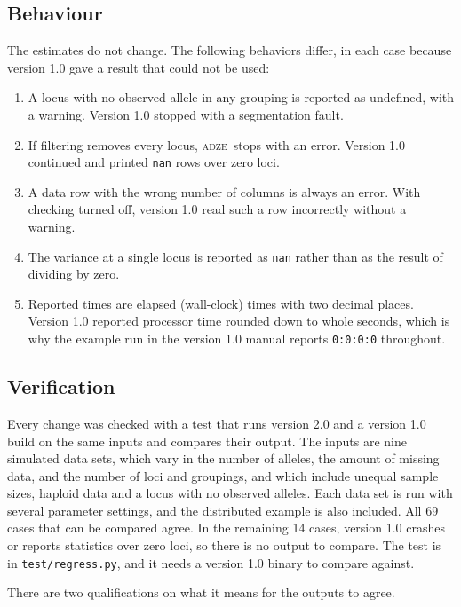 \documentclass[11pt]{article}
\newcommand{\prog}{\textsc{adze}}
\begin{document}
\subsection{Behaviour}

The estimates do not change. The following behaviors differ, in each case
because version 1.0 gave a result that could not be used:

\begin{enumerate}[leftmargin=1.5em]
\item A locus with no observed allele in any grouping is reported as
  undefined, with a warning. Version 1.0 stopped with a segmentation fault.
\item If filtering removes every locus, \prog\ stops with an error. Version 1.0
  continued and printed \texttt{nan} rows over zero loci.
\item A data row with the wrong number of columns is always an error. With
  checking turned off, version 1.0 read such a row incorrectly without a
  warning.
\item The variance at a single locus is reported as \texttt{nan} rather than as
  the result of dividing by zero.
\item Reported times are elapsed (wall-clock) times with two decimal places.
  Version 1.0 reported processor time rounded down to whole seconds, which is
  why the example run in the version 1.0 manual reports \texttt{0:0:0:0}
  throughout.
\end{enumerate}

\subsection{Verification}

Every change was checked with a test that runs version 2.0 and a version 1.0
build on the same inputs and compares their output. The inputs are nine
simulated data sets, which vary in the number of alleles, the amount of
missing data, and the number of loci and groupings, and which include unequal
sample sizes, haploid data and a locus with no observed alleles. Each data set
is run with several parameter settings, and the distributed example is also
included. All 69 cases that can be compared agree. In the remaining 14 cases,
version 1.0 crashes or reports statistics over zero loci, so there is no output
to compare. The test is in \texttt{test/regress.py}, and it needs a version 1.0
binary to compare against.

There are two qualifications on what it means for the outputs to agree.
\end{document}

